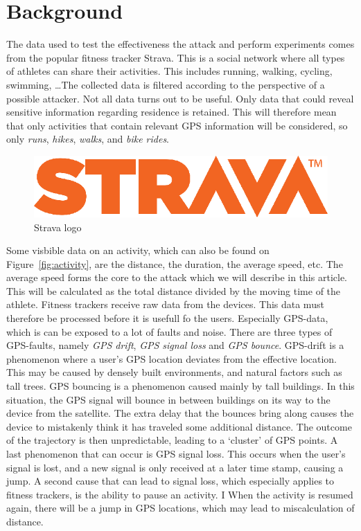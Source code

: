 \documentclass[conference]{IEEEtran}
\begin{document}
\section{\textbf{Background}}
The data used to test the effectiveness the attack and perform experiments
comes from the popular fitness tracker Strava. This is a
social network where all types of athletes can share their activities. This
includes running, walking, cycling, swimming, \ldots The collected data is
filtered according to the perspective of a possible attacker. Not all data
turns out to be useful. Only data that could reveal sensitive information
regarding residence is retained. This will therefore mean that only activities
that contain relevant GPS information will be considered, so only
\textit{runs}, \textit{hikes}, \textit{walks}, and \textit{bike rides}.
\begin{figure}[h]
    \centering
    \includegraphics[width=0.6\linewidth]{fig/Logo_Strava.png}
    \caption{Strava logo~\cite{strava_companie}}\label{fig:stravalogo}
\end{figure}

Some visbible data on an activity, which can also be found on
Figure~\ref{fig:activity}, are the distance, the duration, the average speed,
etc. The average speed forms the core to the attack which we will describe in
this article. This will be calculated as the total distance divided by the
moving time of the athlete. Fitness trackers receive raw data from the devices.
This data must therefore be processed before it is usefull fo the users.
Especially GPS-data, which is can be exposed to a lot of faults and noise.
There are three types of GPS-faults, namely \textit{GPS drift}, \textit{GPS
    signal loss} and \textit{GPS bounce}. GPS-drift is a phenomenon where a user's
GPS location deviates from the effective location. This may be caused by
densely built environments, and natural factors such as tall trees. GPS
bouncing is a phenomenon caused mainly by tall buildings. In this situation,
the GPS signal will bounce in between buildings on its way to the device from
the satellite. The extra delay that the bounces bring along causes the device
to mistakenly think it has traveled some additional distance. The outcome of
the trajectory is then unpredictable, leading to a `cluster' of GPS points. A
last phenomenon that can occur is GPS signal loss. This occurs when the user's
signal is lost, and a new signal is only received at a later time stamp,
causing a jump. A second cause that can lead to signal loss, which especially
applies to fitness trackers, is the ability to pause an activity. I When the
activity is resumed again, there will be a jump in GPS locations, which may
lead to miscalculation of distance.
\end{document}
